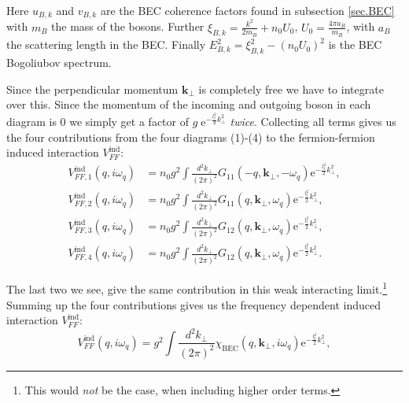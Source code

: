 Here $u_{B,k}$ and $v_{B,k}$ are the BEC coherence factors found in subsection \ref{sec.BEC} with $m_B$ the mass of the bosons. Further $\xi_{B,k} = \frac{k^2}{2m_B}+n_0U_0$, $U_0 = \frac{4\pi a_B}{m_B}$, with $a_B$ the scattering length in the BEC. Finally $E_{B,k}^2 = \xi_{B,k}^2-(n_0U_0)^2$ is the BEC Bogoliubov spectrum.

Since the perpendicular momentum $\mathbf{k}_\perp$ is completely free we have to integrate over this. Since the momentum of the incoming and outgoing boson in each diagram is 0 we simply get a factor of $g\; \text{e}^{-\frac{l_t^2}{4}k_\perp^2}$ \textit{twice}. Collecting all terms gives us the four contributions from the four diagrams (1)-(4) to the fermion-fermion induced interaction $V_{FF}^\text{ind}$: 
\begin{align}
V_{FF,1}^\text{ind}(q,i\omega_q) &= n_0g^2\int\frac{d^2k_\perp}{(2\pi)^2}G_{11}(-q,\mathbf{k}_\perp,-\omega_q)\text{e}^{-\frac{l_t^2}{2}k_\perp^2}, \nonumber \\
V_{FF,2}^\text{ind}(q,i\omega_q) &= n_0g^2\int\frac{d^2k_\perp}{(2\pi)^2}G_{11}(q,\mathbf{k}_\perp,\omega_q)\text{e}^{-\frac{l_t^2}{2}k_\perp^2}, \nonumber \\
V_{FF,3}^\text{ind}(q,i\omega_q) &= n_0g^2\int\frac{d^2k_\perp}{(2\pi)^2}G_{12}(q,\mathbf{k}_\perp,\omega_q)\text{e}^{-\frac{l_t^2}{2}k_\perp^2}, \nonumber \\
V_{FF,4}^\text{ind}(q,i\omega_q) &= n_0g^2\int\frac{d^2k_\perp}{(2\pi)^2}G_{12}(q,\mathbf{k}_\perp,\omega_q)\text{e}^{-\frac{l_t^2}{2}k_\perp^2}. 
\end{align}

The last two we see, give the same contribution in this weak interacting limit.\footnote{This would \textit{not} be the case, when including higher order terms.} Summing up the four contributions gives us the frequency dependent induced interaction $V_{FF}^\text{ind}$:
\begin{equation}
V_{FF}^\text{ind}(q,i\omega_q) = g^2\int\frac{d^2k_\perp}{(2\pi)^2}\chi_\text{BEC}(q,\mathbf{k}_\perp,i\omega_q)\text{e}^{-\frac{l_t^2}{2}k_\perp^2}, 
\label{eq.VFFindXBEC}
\end{equation}

